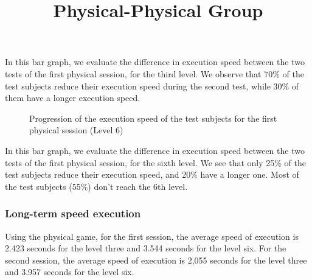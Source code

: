 \documentclass[12pt, openany, twocolumn]{article}
\begin{document}
            In this bar graph, we evaluate the difference in execution speed between the two tests of the first physical session, for the third level.
            We observe that 70\% of the test subjects reduce their execution speed during the second test, while 30\% of them have a longer execution speed.

                \begin{figure}[H]
                    \setlength{\fboxsep}{0pt}
                    \setlength{\fboxrule}{1pt}
                    \caption{Progression of the execution speed of the test subjects for the first physical session (Level 6)}
                \end{figure}

            In this bar graph, we evaluate the difference in execution speed between the two tests of the first physical session, for the sixth level.
            We see that only 25\% of the test subjects reduce their execution speed, and 20\% have a longer one. Most of the test subjects (55\%) don't reach the 6th level.

    \subsubsection{Long-term speed execution}

    \noindent \title{\textbf{Physical-Physical Group}} \vspace{0.25cm}

    Using the physical game, for the first session, the average speed of execution is 2.423 seconds for the level three and 3.544 seconds for the level six. For the second session, the average speed of execution is  2,055 seconds for the level three and 3.957 seconds for the level six.
    \\
\end{document}
